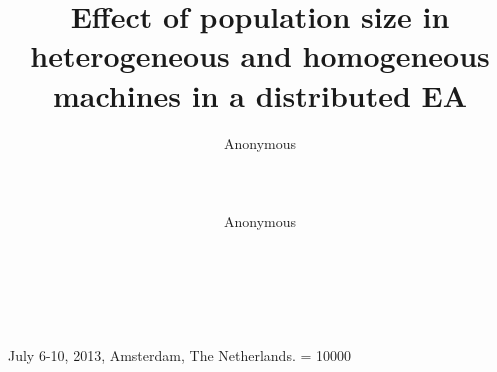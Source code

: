 \documentclass{sig-alternate}
\begin{document}
%
 {July 6-10, 2013, Amsterdam, The Netherlands.}
    \widowpenalty = 10000

\title{Effect of population size in heterogeneous and homogeneous machines in a distributed EA}

%
%
%
%
%


 \author{
 \alignauthor
 Anonymous\\
        \\
        \\
        \\
 \alignauthor
 Anonymous\\
 \\
 \\
 \\
 }

\end{document}
